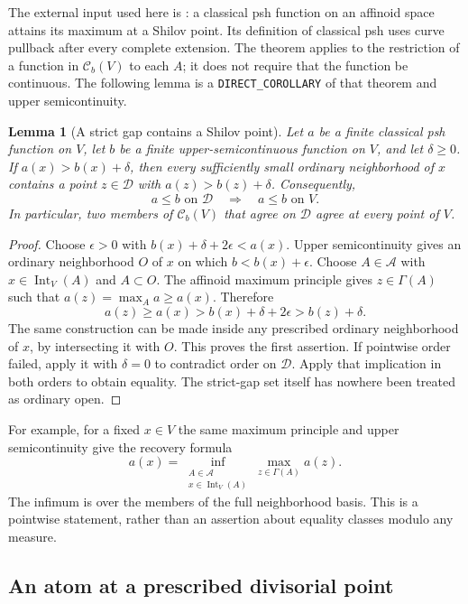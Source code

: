 \documentclass[11pt,a4paper]{article}
\numberwithin{equation}{section}
\newtheorem{lemma}[theorem]{Lemma}
\theoremstyle{definition}
\theoremstyle{remark}
\newcommand{\Cb}{\mathcal C_b}
\begin{document}
The external input used here is \cite[Theorem~6.4, pp.~33--34]{GR25}:
a classical psh function on an affinoid space attains its maximum at a
Shilov point. Its definition of classical psh uses curve pullback after
every complete extension. The theorem applies to the restriction of a
function in $\Cb(V)$ to each $A$; it does not require that the function
be continuous. The following lemma is a \texttt{DIRECT\_COROLLARY} of
that theorem and upper semicontinuity.

\begin{lemma}[A strict gap contains a Shilov point]
\label{lem:r2-shilov-gap}
Let $a$ be a finite classical psh function on $V$, let $b$ be a finite
upper-semicontinuous function on $V$, and let $\delta\geq0$. If
$a(x)>b(x)+\delta$, then every sufficiently small ordinary neighborhood
of $x$ contains a point $z\in\mathscr D$ with
$a(z)>b(z)+\delta$. Consequently,
\[
 a\leq b\text{ on }\mathscr D\quad\Longrightarrow\quad a\leq b
 \text{ on }V.
\]
In particular, two members of $\Cb(V)$ that agree on $\mathscr D$
agree at every point of $V$.
\end{lemma}

\begin{proof}
Choose $\epsilon>0$ with
$b(x)+\delta+2\epsilon<a(x)$. Upper semicontinuity gives an ordinary
neighborhood $O$ of $x$ on which $b<b(x)+\epsilon$. Choose
$A\in\mathscr A$ with $x\in\operatorname{Int}_V(A)$ and $A\subset O$.
The affinoid maximum principle gives $z\in\Gamma(A)$ such that
$a(z)=\max_A a\geq a(x)$. Therefore
\[
 a(z)\geq a(x)>b(x)+\delta+2\epsilon>b(z)+\delta.
\]
The same construction can be made inside any prescribed ordinary
neighborhood of $x$, by intersecting it with $O$. This proves the first
assertion. If pointwise order failed, apply it with $\delta=0$ to
contradict order on $\mathscr D$. Apply that implication in both orders
to obtain equality. The strict-gap set itself has nowhere been treated
as ordinary open.
\end{proof}

For example, for a fixed $x\in V$ the same maximum principle and upper
semicontinuity give the recovery formula
\[
 a(x)=\inf_{\substack{A\in\mathscr A\\
                         x\in\operatorname{Int}_V(A)}}
                  \max_{z\in\Gamma(A)}a(z).
\]
The infimum is over the members of the full neighborhood basis. This
is a pointwise statement, rather than an assertion about equality
classes modulo any measure.

\subsection{An atom at a prescribed divisorial point}
\end{document}
